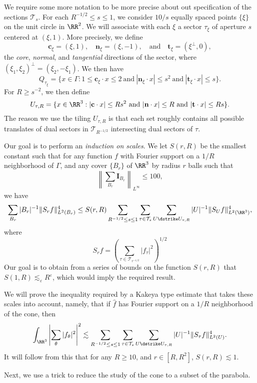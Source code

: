 We require some more notation to be more precise about out specification of the sections $\mathcal{T}_s$. For each $R^{-1/2} \leq s \leq 1$, we consider $10/s$ equally spaced points $\{ \xi \}$ on the unit circle in $\RR^2$. We will associate with each $\xi$ a sector $\tau_\xi$ of aperture $s$ centered at $(\xi,1)$. More precisely, we define
%
\[ \mathbf{c}_\xi = (\xi,1), \quad \mathbf{n}_\xi = (\xi,-1), \quad\text{and}\quad \mathbf{t}_\xi = (\xi^\perp, 0), \]
%
the \emph{core}, \emph{normal}, and \emph{tangential} directions of the sector, where $(\xi_1,\xi_2)^\perp = (\xi_2,- \xi_1)$. We then have
%
\[ Q_{\tau_\xi} = \{ x \in \Gamma: 1 \leq \mathbf{c}_\xi \cdot x \leq 2\ \text{and}\ |\mathbf{n}_\xi \cdot x| \leq s^2\ \text{and}\ |\mathbf{t}_\xi \cdot x| \leq s \}. \]
%
For $R \geq s^{-2}$, we then define
%
\[ U_{\tau,R} = \{ x \in \RR^3: |\mathbf{c} \cdot x| \leq R s^2\ \text{and}\ |\mathbf{n} \cdot x| \leq R\ \text{and}\ |\mathbf{t} \cdot x| \leq Rs \}. \]
%
The reason we use the tiling $U_{\tau,R}$ is that each set roughly contains all possible translates of dual sectors in $\mathcal{T}_{R^{-1/2}}$ intersecting dual sectors of $\tau$.

Our goal is to perform an \emph{induction on scales}. We let $S(r,R)$ be the smallest constant such that for any function $f$ with Fourier support on a $1/R$ neighborhood of $\Gamma$, and any cover $\{ B_r \}$ of $\RR^3$ by radius $r$ balls such that
%
\[ \left\| \sum_{B_r} \mathbf{I}_{B_r} \right\|_{L^\infty} \leq 100, \]
%
we have
%
\[ \sum_{B_r} |B_r|^{-1} \| S_r f \|_{L^2(B_r)}^4 \leq S(r,R) \sum_{R^{-1/2} \leq s \leq 1} \sum_{\tau \in \mathcal{T}_s} \sum_{U \dstrike U_{\tau,R}} |U|^{-1} \| S_U f \|_{L^2(\RR^3)}^4, \]
%
where
%
\[ S_r f = \left( \sum_{\tau \in \mathcal{T}_{r^{-1/2}}} |f_\tau|^2 \right)^{1/2} \]
%
Our goal is to obtain from a series of bounds on the function $S(r,R)$ that $S(1,R) \lesssim_\varepsilon R^\varepsilon$, which would imply the required result.

We will prove the inequality required by a Kakeya type estimate that takes these scales into account, namely, that if $\widehat{f}$ has Fourier support on a $1/R$ neighborhood of the cone, then
%
\[ \int_{\RR^3} \left| \sum_\theta |f_\theta|^2 \right|^2 \lesssim \sum_{R^{-1/2} \leq s \leq 1} \sum_{\tau \in \mathcal{T}_s} \sum_{U \dstrike U_{\tau,R}} |U|^{-1} \| S_\tau f \|_{L^2(U)}^4. \]
%
It will follow from this that for any $R \geq 10$, and $r \in [R,R^2]$, $S(r,R) \lesssim 1$.

Next, we use a trick to reduce the study of the cone to a subset of the parabola.

